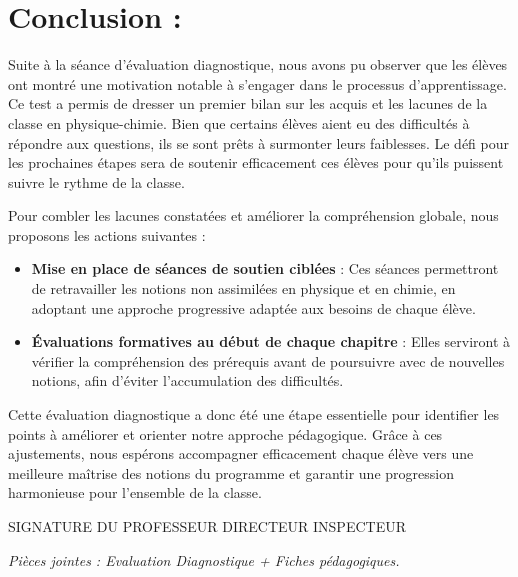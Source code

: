 \documentclass[12pt]{article}
\begin{document}
\section*{Conclusion : }
\hspace{2cm} Suite à la séance d’évaluation diagnostique, nous avons pu observer que les élèves ont montré une motivation notable à s’engager dans le processus d’apprentissage. Ce test a permis de dresser un premier bilan sur les acquis et les lacunes de la classe en physique-chimie. Bien que certains élèves aient eu des difficultés à répondre aux questions, ils se sont prêts à surmonter leurs faiblesses. Le défi pour les prochaines étapes sera de soutenir efficacement ces élèves pour qu'ils puissent suivre le rythme de la classe.

Pour combler les lacunes constatées et améliorer la compréhension globale, nous proposons les actions suivantes :

\begin{itemize}
  \item \textbf{Mise en place de séances de soutien ciblées} : Ces séances permettront de retravailler les notions non assimilées en physique et en chimie, en adoptant une approche progressive adaptée aux besoins de chaque élève.

  \item \textbf{Évaluations formatives au début de chaque chapitre} : Elles serviront à vérifier la compréhension des prérequis avant de poursuivre avec de nouvelles notions, afin d’éviter l’accumulation des difficultés.

\end{itemize}
Cette évaluation diagnostique a donc été une étape essentielle pour identifier les points à améliorer et orienter notre approche pédagogique. Grâce à ces ajustements, nous espérons accompagner efficacement chaque élève vers une meilleure maîtrise des notions du programme et garantir une progression harmonieuse pour l’ensemble de la classe.

 \vspace{5cm}
 SIGNATURE DU PROFESSEUR \hspace{3cm} DIRECTEUR  \hspace{3cm} INSPECTEUR

 \vspace{6cm}
\emph{Pièces jointes : Evaluation Diagnostique + Fiches pédagogiques.}
\end{document}

